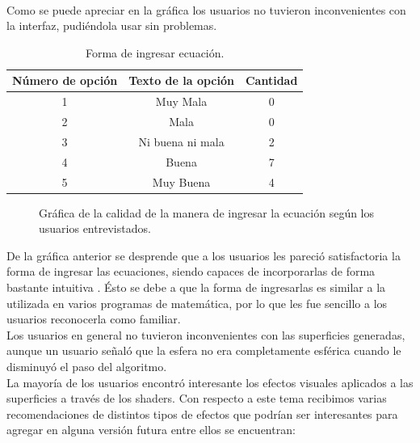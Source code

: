 \documentclass[12pt]{article}
\begin{document}
\\Como se puede apreciar en la gráfica los usuarios no tuvieron inconvenientes con la interfaz, pudiéndola usar sin problemas.
\clearpage
\begin{table}[h!]
  \centering
  \label{tab:table1}
  \begin{tabular}{ccc}
    \toprule
    Número de opción &  Texto de la opción &Cantidad\\
    \midrule
    1 & Muy Mala & 0 \\
    2 & Mala & 0 \\
    3 & Ni buena ni mala & 2 \\
    4 & Buena & 7\\
    5 & Muy Buena & 4\\
    \bottomrule
  \end{tabular}
  \caption{Forma de ingresar ecuación.}
\end{table}

  \begin{figure}[!ht]
    \centering
    \caption{Gráfica de la calidad de la manera de ingresar la ecuación según los usuarios entrevistados.}
    \label{fig:data}
  \end{figure}
De la gráfica anterior se desprende que a los usuarios les pareció satisfactoria la forma de ingresar las ecuaciones, siendo capaces de incorporarlas de forma bastante intuitiva . Ésto se debe a que la forma de ingresarlas es similar a la utilizada en varios programas de matemática, por lo que les fue sencillo a los usuarios reconocerla como familiar.
\\Los usuarios en general no tuvieron inconvenientes con las superficies generadas, aunque un usuario señaló que la esfera no era completamente esférica cuando le disminuyó el paso del algoritmo. 
\\La mayoría de los usuarios encontró interesante los efectos visuales aplicados a las superficies a través de los shaders. Con respecto a este tema recibimos varias recomendaciones de distintos tipos de efectos que podrían ser interesantes para agregar en alguna versión futura entre ellos se encuentran: 
\end{document}
